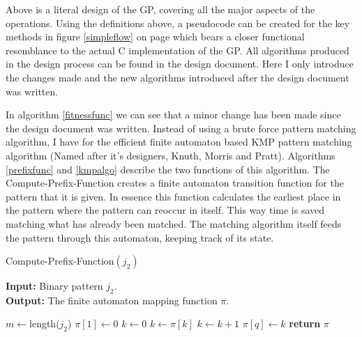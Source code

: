 \documentclass[a4paper,10.5pt]{article}
\begin{document}
Above is a literal design of the GP, covering all the major aspects of the operations. Using the definitions above, a pseudocode can be created for the key methods in figure \ref{simpleflow} on page \pageref{simpleflow} which bears a closer functional resemblance to the actual C implementation of the GP. All algorithms produced in the design process can be found in the design document. Here I only introduce the changes made and the new algorithms introduced after the design document was written. 

In algorithm \ref{fitnessfunc} we can see that a minor change has been made since the design document was written. Instead of using a brute force pattern matching algorithm, I have for the efficient finite automaton based KMP pattern matching algorithm (Named after it's designers, Knuth, Morris and Pratt). Algorithms \ref{prefixfunc} and \ref{kmpalgo} describe the two functions of this algorithm. The Compute-Prefix-Function creates a finite automaton transition function for the pattern that it is given. In essence this function calculates the earliest place in the pattern where the pattern can reoccur in itself. This way time is saved matching what has already been matched. The matching algorithm itself feeds the pattern through this automaton, keeping track of its state.

\begin{algorithm}[H]
  \caption{Compute-Prefix-Function$(j_2)$}
  \textbf{Input:} Binary pattern $j_2$.\\
  \textbf{Output:} The finite automaton mapping function $\pi$.\\
  \begin{algorithmic}[1]
	\State $m \gets $length($j_2$)
	\State $\pi[1] \gets 0$
	\State $k \gets 0$
			\State $k \gets \pi[k]$
		\EndWhile
			\State $k \gets k + 1$
		\EndIf
		\State $\pi[q] \gets k$
	\EndFor
	\State \textbf{return} $\pi$ 

  \end{algorithmic}
\label{prefixfunc}
\end{algorithm}
\end{document}

